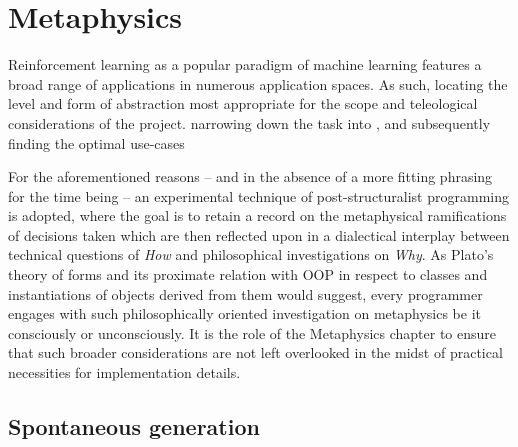 \documentclass[]{article}
\begin{document}
\section{Metaphysics}

Reinforcement learning as a popular paradigm of machine learning features a broad range of applications in numerous application spaces. As such, locating the level and form of abstraction most appropriate for the scope and teleological considerations of the project. narrowing down the task into , and subsequently finding the optimal use-cases

For the aforementioned reasons -- and in the absence of a more fitting phrasing for the time being -- an experimental technique of post-structuralist programming is adopted, where the goal is to retain a record on the metaphysical ramifications of decisions taken which are then reflected upon in a dialectical interplay between technical questions of \textit{How} and philosophical investigations on \textit{Why}. As Plato's theory of forms and its proximate relation with OOP in respect to classes and instantiations of objects derived from them would suggest, every programmer engages with such philosophically oriented investigation on metaphysics be it consciously or unconsciously. It is the role of the Metaphysics chapter to ensure that such broader considerations are not left overlooked in the midst of practical necessities for implementation details.

\subsection{Spontaneous generation}
\end{document}
